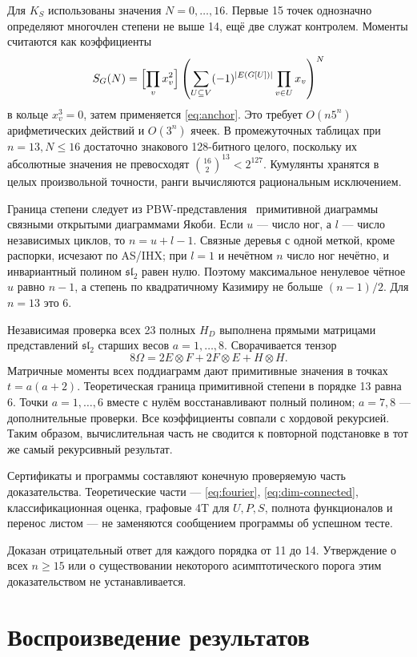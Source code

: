 \documentclass[11pt,a4paper]{article}
\numberwithin{equation}{section}
\theoremstyle{definition}
\theoremstyle{remark}
\newcommand{\sll}{\mathfrak{sl}}
\begin{document}
Для $K_S$ использованы значения $N=0,\ldots,16$.
Первые 15 точек однозначно определяют многочлен степени не выше 14,
ещё две служат контролем. Моменты считаются как коэффициенты
\[
 S_G(N)=\Bigl[\prod_v x_v^2\Bigr]
 \left(\sum_{U\subseteq V}(-1)^{|E(G[U])|}\prod_{v\in U}x_v\right)^N
\]
в кольце $x_v^3=0$, затем применяется \eqref{eq:anchor}.
Это требует $O(n5^n)$ арифметических действий и $O(3^n)$ ячеек.
В промежуточных таблицах при $n=13,N\le16$ достаточно знакового
128-битного целого, поскольку их абсолютные значения не превосходят
$\binom{16}2^{13}<2^{127}$. Кумулянты хранятся в целых произвольной
точности, ранги вычисляются рациональным исключением.

Граница степени следует из PBW-представления~\cite{cdm} примитивной диаграммы
связными открытыми диаграммами Якоби. Если $u$ --- число ног, а $l$
--- число независимых циклов, то $n=u+l-1$. Связные деревья с одной
меткой, кроме распорки, исчезают по AS/IHX; при $l=1$ и нечётном $n$
число ног нечётно, и инвариантный полином $\sll_2$ равен нулю.
Поэтому максимальное ненулевое чётное $u$ равно $n-1$, а степень
по квадратичному Казимиру не больше $(n-1)/2$. Для $n=13$ это 6.

Независимая проверка всех 23 полных $H_D$ выполнена прямыми матрицами
представлений $\sll_2$ старших весов $a=1,\ldots,8$.
Сворачивается тензор
\[
 8\Omega=2E\otimes F+2F\otimes E+H\otimes H.
\]
Матричные моменты всех поддиаграмм дают примитивные значения в точках
$t=a(a+2)$. Теоретическая граница примитивной степени в порядке 13
равна 6. Точки $a=1,\ldots,6$ вместе с нулём восстанавливают полный
полином; $a=7,8$ --- дополнительные проверки. Все коэффициенты совпали
с хордовой рекурсией. Таким образом, вычислительная часть не сводится
к повторной подстановке в тот же самый рекурсивный результат.

Сертификаты и программы составляют конечную проверяемую часть
доказательства. Теоретические части --- \eqref{eq:fourier},
\eqref{eq:dim-connected}, классификационная оценка,
графовые 4T для $U,P,S$, полнота функционалов и перенос листом ---
не заменяются сообщением программы об успешном тесте.

Доказан отрицательный ответ для каждого порядка от 11 до 14.
Утверждение о всех $n\ge15$ или о существовании некоторого
асимптотического порога этим доказательством не устанавливается.

\section{Воспроизведение результатов}
\end{document}
